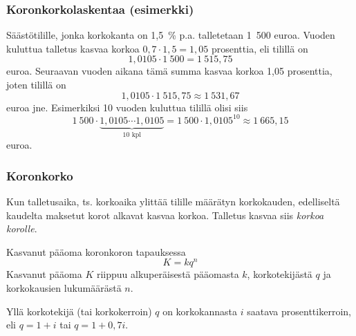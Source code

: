 \documentclass[handout]{beamer}\usepackage[]{graphicx}\usepackage[]{color}
\theoremstyle{remark}
\newtheorem{ratkaisu}{Ratkaisuehdotus}
\begin{document}

\begin{frame}
\frametitle{Koronkorkolaskentaa (esimerkki)}
		Säästötilille, jonka korkokanta on 1,5~\% p.a. talletetaan 1~500 euroa. Vuoden kuluttua talletus kasvaa korkoa \(0,7\cdot 1,5 = 1{,}05\) prosenttia, eli tilillä on 
    \[
    1{,}0105\cdot1~500 = 1~515{,}75
    \]euroa. Seuraavan vuoden aikana tämä summa kasvaa korkoa 1{,}05 prosenttia, joten tilillä on 
    \[
    1{,}0105\cdot1~515{,}75 \approx 1~531{,}67
    \]euroa jne. Esimerkiksi 10 vuoden kuluttua tilillä olisi siis
    \[
    1~500\cdot\underbrace{1{,}0105\cdots1{,}0105}_{10\text{ kpl}} = 1~500\cdot1{,}0105^{10} \approx 1~665{,}15
    \] euroa.

\end{frame}

\begin{frame}
\frametitle{Koronkorko}  \pause
  Kun talletusaika, ts. korkoaika ylittää tilille määrätyn korkokauden, edelliseltä kaudelta maksetut korot alkavat kasvaa korkoa. 
  \pause
  Talletus kasvaa siis \emph{korkoa korolle}.
	\begin{block}{Kasvanut pääoma koronkoron tapauksessa}
		\[
			K = kq^n
		\]
		Kasvanut pääoma \(K\) riippuu alkuperäisestä pääomasta \(k\), korkotekijästä \(q\) ja korkokausien lukumäärästä \(n\).
	\end{block}
	Yllä korkotekijä (tai korkokerroin) \(q\) on korkokannasta \(i\) saatava prosenttikerroin, eli \(q = 1+i\) tai \(q = 1 + 0,7i\).
\end{frame}

\end{document}

